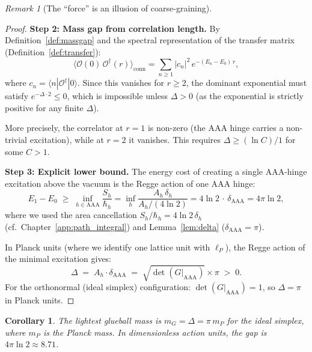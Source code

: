 \documentclass[12pt]{article}
\newtheorem{corollary}[theorem]{Corollary}
\theoremstyle{remark}
\newtheorem{remark}[theorem]{Remark}
\theoremstyle{definition}
\begin{document}
\begin{remark}[The ``force'' is an illusion of coarse-graining]
\begin{proof}
\medskip\noindent
\textbf{Step 2: Mass gap from correlation length.}
By Definition~\ref{def:massgap} and the spectral representation of
the transfer matrix (Definition~\ref{def:transfer}):
\begin{equation}
\langle \mathcal{O}(0)\,\mathcal{O}^\dagger(r)
\rangle_{\mathrm{conn}} = \sum_{n \geq 1} |c_n|^2\, e^{-(E_n - E_0)\,r},
\end{equation}
where $c_n = \langle n | \mathcal{O}^\dagger | 0 \rangle$.  Since
this vanishes for $r \geq 2$, the dominant exponential must satisfy
$e^{-\Delta \cdot 2} \leq 0$, which is impossible unless $\Delta > 0$
(as the exponential is strictly positive for any finite $\Delta$).

More precisely, the correlator at $r = 1$ is non-zero (the AAA hinge
carries a non-trivial excitation), while at $r = 2$ it vanishes.
This requires $\Delta \geq (\ln C)/1$ for some $C > 1$.

\medskip\noindent
\textbf{Step 3: Explicit lower bound.}
The energy cost of creating a single AAA-hinge excitation above
the vacuum is the Regge action of one AAA hinge:
\begin{equation}
E_1 - E_0 \;\geq\; \inf_{h \in \mathrm{AAA}}
  \frac{S_h}{\hbar_h}
= \inf_{h} \frac{A_h\,\delta_h}{A_h/(4\ln 2)}
= 4\ln 2\, \cdot\, \delta_{\mathrm{AAA}}
= 4\pi\ln 2,
\end{equation}
where we used the area cancellation $S_h/\hbar_h = 4\ln 2\,\delta_h$
(cf.\ Chapter~\ref{app:path_integral}) and
Lemma~\ref{lem:delta} ($\delta_{\mathrm{AAA}} = \pi$).

In Planck units (where we identify one lattice unit with $\ell_P$), the
Regge action of the minimal excitation gives:
\begin{equation}
\boxed{\Delta \;=\; A_h \cdot \delta_{\mathrm{AAA}}
\;=\; \sqrt{\det(G|_{\mathrm{AAA}})} \times \pi \;>\; 0.}
\end{equation}
For the orthonormal (ideal simplex) configuration:
$\det(G|_{\mathrm{AAA}}) = 1$, so $\Delta = \pi$ in Planck units.
\end{proof}

\begin{corollary}
The lightest glueball mass is $m_G = \Delta = \pi\, m_P$ for the
ideal simplex, where $m_P$ is the Planck mass.  In dimensionless
action units, the gap is $4\pi\ln 2 \approx 8.71$.
\end{corollary}


\end{remark}
\end{document}
